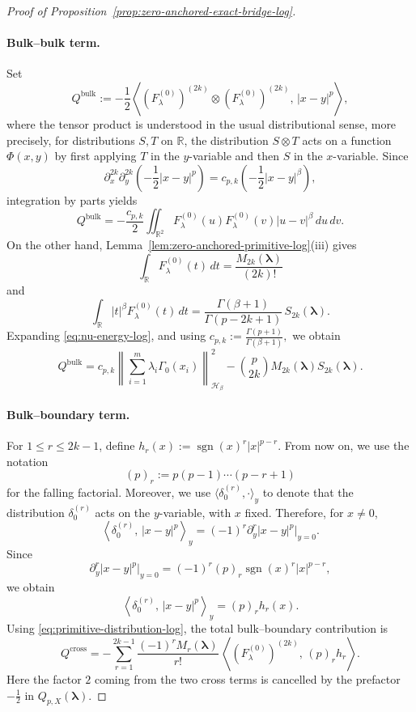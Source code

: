 \documentclass[11pt]{article}
\theoremstyle{definition}
\begin{document}
\begin{proof}[Proof of Proposition~\ref{prop:zero-anchored-exact-bridge-log}]
\paragraph{Bulk--bulk term.}
Set
\[
Q^{\mathrm{bulk}}
:=
-\frac12\left\langle
(F_\lambda^{(0)})^{(2k)}\otimes (F_\lambda^{(0)})^{(2k)},
\,|x-y|^p
\right\rangle,
\]
where the tensor product is understood in the usual distributional sense, more precisely,
for distributions \(S,T\) on \(\mathbb R\), the distribution \(S\otimes T\) acts on a
function \(\Phi(x,y)\) by first applying \(T\) in the \(y\)-variable and then \(S\)
in the \(x\)-variable.
Since
\[
\partial_x^{2k}\partial_y^{2k}\left(-\frac12|x-y|^p\right)
=
c_{p,k}\left(-\frac12|x-y|^\beta\right),
\]
integration by parts yields
\[
Q^{\mathrm{bulk}}
=
-\frac{c_{p,k}}2
\iint_{\mathbb R^2}
F_\lambda^{(0)}(u)F_\lambda^{(0)}(v)|u-v|^\beta\,du\,dv.
\]
On the other hand, Lemma~\ref{lem:zero-anchored-primitive-log}\textnormal{(iii)} gives
\[
\int_{\mathbb R}F_\lambda^{(0)}(t)\,dt
=
\frac{M_{2k}(\boldsymbol\lambda)}{(2k)!}\]
and
\[
\int_{\mathbb R}|t|^\beta F_\lambda^{(0)}(t)\,dt
=
\frac{\Gamma(\beta+1)}{\Gamma(p-2k+1)}\,S_{2k}(\boldsymbol\lambda).
\]
Expanding \eqref{eq:nu-energy-log}, and using
\(c_{p,k}:=\frac{\Gamma(p+1)}{\Gamma(\beta+1)},\) we obtain
\begin{equation}\label{eq:bulk-identity-log}
Q^{\mathrm{bulk}}
=
c_{p,k}
\left\|\sum_{i=1}^m \lambda_i \Gamma_0(x_i)\right\|_{\mathcal H_\beta}^2
-
\binom{p}{2k}M_{2k}(\boldsymbol\lambda)S_{2k}(\boldsymbol\lambda).
\end{equation}

\paragraph{Bulk--boundary term.}
For $1\le r\le 2k-1$, define
\(
h_r(x):=\operatorname{sgn}(x)^r |x|^{p-r}.
\) From now on, we use the notation \[ (p)_r:=p(p-1)\cdots(p-r+1) \] for the falling factorial.
Moreover, we use \(\langle \delta_0^{(r)},\cdot\rangle_y\) to denote that the distribution \(\delta_0^{(r)}\) acts on the \(y\)-variable, with \(x\) fixed. Therefore, for \(x\neq0\),
\[
\left\langle \delta_0^{(r)},\,|x-y|^p\right\rangle_y = (-1)^r \partial_y^r |x-y|^p\big|_{y=0}.
\]
Since 
\[
\partial_y^r |x-y|^p\big|_{y=0} = (-1)^r (p)_r \operatorname{sgn}(x)^r |x|^{p-r},
\]
we obtain \[ \left\langle \delta_0^{(r)},\,|x-y|^p\right\rangle_y = (p)_r h_r(x). \]
Using \eqref{eq:primitive-distribution-log}, the total bulk--boundary contribution is
\[
Q^{\mathrm{cross}}
=
-\sum_{r=1}^{2k-1}\frac{(-1)^r M_r(\boldsymbol\lambda)}{r!}\,
\left\langle (F_\lambda^{(0)})^{(2k)},\,(p)_r h_r\right\rangle.
\]
Here the factor $2$ coming from the two cross terms is cancelled by the
prefactor $-\frac12$ in $Q_{p,X}(\boldsymbol\lambda)$.


\end{proof}
\end{document}
